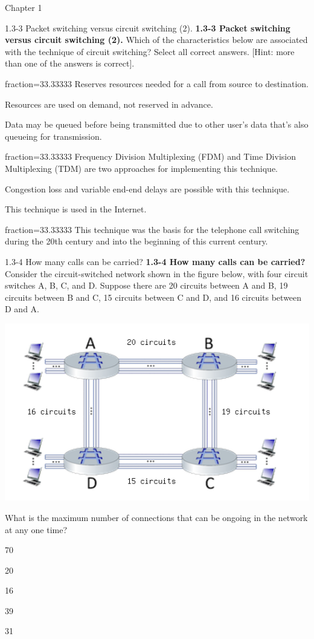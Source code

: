 \documentclass[a4paper]{article}
\begin{document}
\begin{quiz}{Chapter 1}
\begin{multi}[points=1,shuffle=true,multiple]{1.3-3 Packet switching versus circuit switching (2).}
\textbf{1.3-3 Packet switching versus circuit switching (2).} 
Which of the characteristics below are associated with the technique of circuit switching? Select all correct answers. [Hint: more than one of the answers is correct].
\item[fraction=33.33333] Reserves resources needed for a call from source to destination.
\item Resources are used on demand, not reserved in advance.
\item Data may be queued before being transmitted due to other user's data that's also queueing for transmission.
\item[fraction=33.33333] Frequency Division Multiplexing (FDM) and Time Division Multiplexing (TDM) are two approaches for implementing this technique.
\item Congestion loss and variable end-end delays are possible with this technique.
\item This technique is used in the Internet.
\item[fraction=33.33333] This technique was the basis for the telephone call switching during the 20th century and into the beginning of this current century.
\end{multi}

\begin{multi}[points=1,shuffle=true]{1.3-4 How many calls can be carried?}
\textbf{1.3-4 How many calls can be carried?} 
Consider the circuit-switched network shown in the figure below, with four circuit switches A, B, C, and D. Suppose there are 20 circuits between A and B, 19 circuits between B and C, 15 circuits between C and D, and 16 circuits between D and A. 
\begin{center}
\includegraphics[width=\linewidth]{figs/1.3.4.png}
\end{center}
What is the maximum number of connections that can be ongoing in the network at any one time?
\item* 70
\item 20
\item 16
\item 39
\item 31
\end{multi}


\end{quiz}
\end{document}
